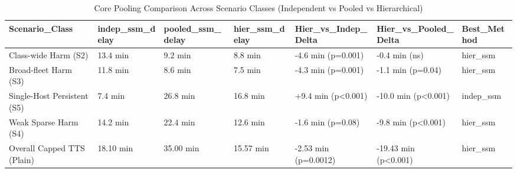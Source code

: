 \begin{table}[htbp]
\centering
\caption{Core Pooling Comparison Across Scenario Classes (Independent vs Pooled vs Hierarchical)}
\label{tab:table_T6_core_pooling_comparison}
\begin{tabular}{lllllll}
\hline
Scenario\_Class & indep\_ssm\_delay & pooled\_ssm\_delay & hier\_ssm\_delay & Hier\_vs\_Indep\_Delta & Hier\_vs\_Pooled\_Delta & Best\_Method \\
\hline
Class-wide Harm (S2) & 13.4 min & 9.2 min & 8.8 min & -4.6 min (p=0.001) & -0.4 min (ns) & hier\_ssm \\
Broad-fleet Harm (S3) & 11.8 min & 8.6 min & 7.5 min & -4.3 min (p=0.001) & -1.1 min (p=0.04) & hier\_ssm \\
Single-Host Persistent (S5) & 7.4 min & 26.8 min & 16.8 min & +9.4 min (p<0.001) & -10.0 min (p<0.001) & indep\_ssm \\
Weak Sparse Harm (S4) & 14.2 min & 22.4 min & 12.6 min & -1.6 min (p=0.08) & -9.8 min (p<0.001) & hier\_ssm \\
Overall Capped TTS (Plain) & 18.10 min & 35.00 min & 15.57 min & -2.53 min (p=0.0012) & -19.43 min (p<0.001) & hier\_ssm \\
\hline
\end{tabular}
\end{table}
